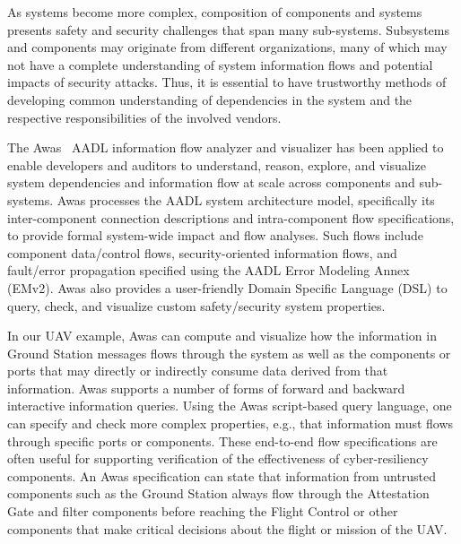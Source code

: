 
As systems become more complex, composition of components and 
systems presents safety and security challenges that span
many sub-systems.  Subsystems and components may originate from
different organizations, many of which may not have a complete
understanding of system information flows and potential impacts of
security attacks.  Thus, it is essential to have trustworthy methods
of developing common understanding of dependencies in the system and
the respective responsibilities of the involved vendors.  

The Awas~\cite{awas} AADL information flow analyzer and visualizer has been 
applied to enable developers and auditors to understand, reason,
explore, and visualize system dependencies and information flow at
scale across components and sub-systems.  Awas processes the AADL
system architecture model, specifically its inter-component connection
descriptions and intra-component flow specifications, to provide
formal system-wide impact and flow analyses.
Such flows include component data/control flows,
security-oriented information flows, and fault/error propagation
specified using the AADL Error Modeling Annex (EMv2).
Awas also provides a user-friendly Domain Specific Language (DSL) to 
query, check, and visualize custom safety/security system properties.

%
In our UAV example, Awas can compute and visualize how the information in Ground Station messages flows through the system
as well as the components or ports that may directly or indirectly consume data derived from that information.
Awas supports a number of forms of forward and backward interactive information queries.
Using the Awas script-based query language, one can specify and check more complex properties, e.g.,
that information must flows through specific ports or components.
These end-to-end flow specifications are often useful for supporting verification of the
effectiveness of cyber-resiliency components.   An Awas specification can state that
information from untrusted components such as the Ground Station always flow through the
Attestation Gate and filter components before reaching the Flight Control or other components
that make critical decisions about the flight or mission of the UAV.

